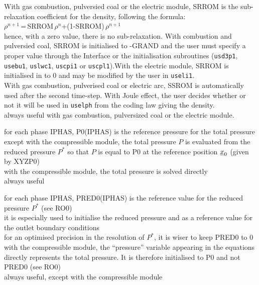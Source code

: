 {With gas combustion, pulversied coal or the electric module, SRROM
 is the sub-relaxation coefficient for the density, following the formula:\\
$\rho^{n+1}$\,=\,SRROM\,$\rho^n$+(1-SRROM)\,$\rho^{n+1}$\\
hence, with a zero value, there is no sub-relaxation.
With combustion and pulversied coal, SRROM is initialised to -GRAND
and the user must specify a proper value through the Interface or the
initialisation subroutines (\texttt{usd3p1},
 \texttt{usebu1}, \texttt{uslwc1}, \texttt{uscpi1} or
\texttt{uscpl1}).With the electric module, SRROM is initialised in to 0
and may be modified by the user in \texttt{useli1}.\\
With gas combustion, pulverised coal or electric arc, SSROM is
automatically used after the second time-step. With Joule effect,
the user decides whether or not it will be used in \texttt{uselph}
from the coding law giving the density.}\\
always useful with gas combustion, pulversized coal or the electric module.

{for each phase IPHAS, P0(IPHAS) is the reference pressure for the total
pressure\\
except with the compressible module, the total pressure $P$ is evaluated
from the reduced pressure $P^*$ so that $P$
is equal to P0 at the reference position $\underline{x}_0$ (given by XYZP0)\\
with the compressible module, the total pressure is solved directly\\
always useful}

{for each phase IPHAS, PRED0(IPHAS) is the reference value for the reduced
pressure $P^*$ (see RO0)\\
it is especially used to initialise the reduced pressure and as a reference
value for the outlet boundary conditions\\
for an optimised precision in the resolution of $P^*$, it is wiser to keep PRED0
to 0\\
with the compressible module, the ``pressure'' variable appearing in the
equations directly represents the total pressure. It is therefore initialised
to P0 and not PRED0 (see RO0)\\
always useful, except with the compressible module}

